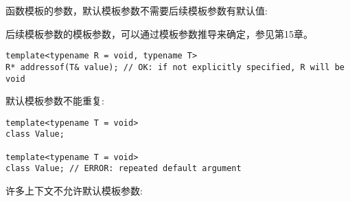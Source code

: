 函数模板的参数，默认模板参数不需要后续模板参数有默认值:

\begin{tcolorbox}[colback=webgreen!5!white,colframe=webgreen!75!black]
\hspace*{0.75cm}后续模板参数的模板参数，可以通过模板参数推导来确定，参见第15章。
\end{tcolorbox}

\begin{lstlisting}[style=styleCXX]
template<typename R = void, typename T>
R* addressof(T& value); // OK: if not explicitly specified, R will be void
\end{lstlisting}

默认模板参数不能重复:

\begin{lstlisting}[style=styleCXX]
template<typename T = void>
class Value;

template<typename T = void>
class Value; // ERROR: repeated default argument
\end{lstlisting}

许多上下文不允许默认模板参数:

